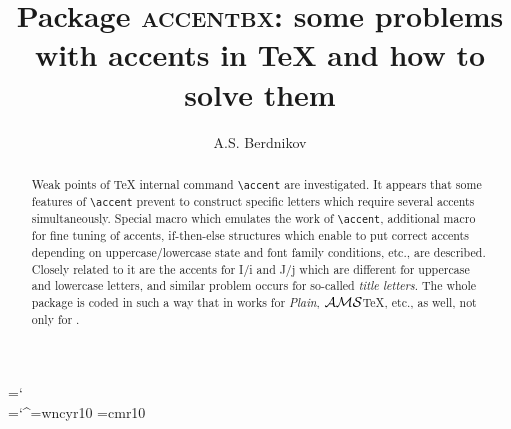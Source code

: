 \title{Package \textsc{accentbx}: some problems with accents
in \TeX{} and how to solve them}
\author{A.S. Berdnikov}
\titlehead{Package \textsc{accentbx}}
\maketitle
\date{}
\def\AmS{$\cal AMS$}

\chardef\bs=`\\
\chardef\bh=`\^

\font\cyrfont=wncyr10
\font\cmfont=cmr10

\def\TA#1{\upaccent{{\tiny a}}{#1}}
\def\tA#1{\upaccent{\aboxsplitup{\tiny a}}{#1}}
\def\burg{b\upaccent{\Aboxshift{\char"15}}{\markchar}g}
\def\BURG{B\upaccent{\Aboxshift{\char"15}}{\MARKCHAR}G}
\def\Burg{b\upaccent{\Aboxshift{\char"15}}{\marktwochar bg}g}
\def\Tcomma#1{\upaccent{,}{#1}}
\def\tcomma#1{\upaccent{\Aboxsplit{\Aboxbase{,}}}{#1}}

\makeatletter
\def\hackersmile{\@ifnextchar[{\@hackersmile}{\@hackersmile[8]}}
\def\@hackersmile[#1]{\hbox{%
   \unitlength=1pt\relax
   \unitlength=#1\unitlength
   \divide\unitlength by 10\relax
   \thicklines
   \raise -3\unitlength \hbox{%
   \begin{picture}(12,12)(-6,-6)
   \put(0,0){\circle{10}}
   \put(-2,1.75){\circle*{1}}
   \put(2,1.75){\circle*{1}}
   \thicklines
   \put(-2.75,3){\line(1,0){1.5}}
   \put(2.75,3){\line(-1,0){1.5}}
   \put(0,-1){\line(0,1){3}}
   \put(-2.5,-2.5){\line(1,0){5}}
   \put(-2.5,-2.5){\line(0,1){1}}
   \put(2.5,-2.5){\line(0,1){1}}
   \end{picture}%
}}}
\makeatother


\begin{abstract}
Weak points of \TeX{} internal command \verb?\accent?
are investigated. It appears that some features of \verb?\accent?
prevent to construct specific letters
which require several accents simultaneously.
Special macro which emulates the work of \verb?\accent?,
additional macro for fine tuning of accents,
\textsf{if-then-else} structures which enable to put correct accents
depending on uppercase/lowercase state and font family conditions, etc.,
are described.
Closely related to it are the accents for I/i and J/j which are different
for uppercase and lowercase letters, and similar
problem occurs for so-called \textit{title letters}.
The whole package is coded in such a way
that in works for {\sl Plain},
\AmS\TeX, etc., as well, not only for \LaTeXe.
\end{abstract}


